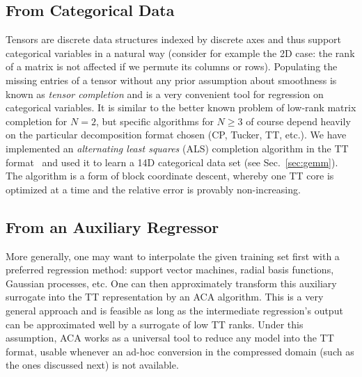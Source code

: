 \documentclass[review, twocolumn]{svjour3}          %
\begin{document}
\subsection{From Categorical Data} \label{sec:categorical_data}

Tensors are discrete data structures indexed by discrete axes and thus support categorical variables in a natural way (consider for example the 2D case: the rank of a matrix is not affected if we permute its columns or rows). Populating the missing entries of a tensor without any prior assumption about smoothness is known as \emph{tensor completion} and is a very convenient tool for regression on categorical variables. It is similar to the better known problem of low-rank matrix completion for $N = 2$, but specific algorithms for $N \ge 3$ of course depend heavily on the particular decomposition format chosen (CP, Tucker, TT, etc.). We have implemented an \emph{alternating least squares} (ALS) completion algorithm in the TT format~\cite{GKT:13} and used it to learn a 14D categorical data set (see Sec.~\ref{sec:gemm}). The algorithm is a form of block coordinate descent, whereby one TT core is optimized at a time and the relative error is provably non-increasing.

\subsection{From an Auxiliary Regressor} \label{sec:auxiliary_regression}

More generally, one may want to interpolate the given training set first with a preferred regression method: support vector machines, radial basis functions, Gaussian processes, etc. One can then approximately transform this auxiliary surrogate into the TT representation by an ACA algorithm. This is a very general approach and is feasible as long as the intermediate regression's output can be approximated well by a surrogate of low TT ranks. Under this assumption, ACA works as a universal tool to reduce any model into the TT format, usable whenever an ad-hoc conversion in the compressed domain (such as the ones discussed next) is not available.

\end{document}
